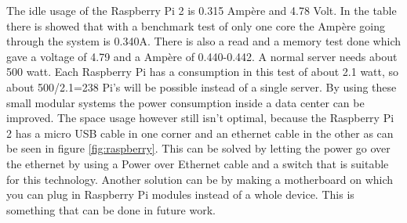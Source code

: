 \documentclass{sig-alternate-br}
\begin{document}
The idle usage of the Raspberry Pi 2 is 0.315 Ampère and 4.78 Volt. In the table there is showed that with a benchmark test of only one core the Ampère going through the system is  0.340A. There is also a read  and a memory test done which gave a voltage of 4.79 and a Ampère of 0.440-0.442.  A normal server needs about 500 watt. Each Raspberry Pi has a consumption in this test of about 2.1 watt, so about 500/2.1=238 Pi's will be possible instead of a single server. By using these small modular systems the power consumption inside a data center can be improved. The space usage however still isn't optimal, because the Raspberry Pi 2 has a micro USB cable  in one corner and an ethernet cable in the other as can be seen in figure \ref{fig:raspberry}. 
This can be solved by letting the power go over the ethernet by using a Power over Ethernet cable and a switch that is suitable for this technology. Another solution can be by making a motherboard on which you can plug in Raspberry Pi modules instead of a whole device. This is something that can be done in future work. 
\end{document}
